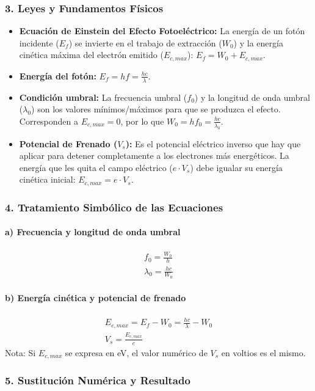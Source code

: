 \subsubsection*{3. Leyes y Fundamentos Físicos}
\begin{itemize}
    \item \textbf{Ecuación de Einstein del Efecto Fotoeléctrico:} La energía de un fotón incidente ($E_f$) se invierte en el trabajo de extracción ($W_0$) y la energía cinética máxima del electrón emitido ($E_{c,max}$): $E_f = W_0 + E_{c,max}$.
    \item \textbf{Energía del fotón:} $E_f = hf = \frac{hc}{\lambda}$.
    \item \textbf{Condición umbral:} La frecuencia umbral ($f_0$) y la longitud de onda umbral ($\lambda_0$) son los valores mínimos/máximos para que se produzca el efecto. Corresponden a $E_{c,max}=0$, por lo que $W_0 = hf_0 = \frac{hc}{\lambda_0}$.
    \item \textbf{Potencial de Frenado ($V_s$):} Es el potencial eléctrico inverso que hay que aplicar para detener completamente a los electrones más energéticos. La energía que les quita el campo eléctrico ($e \cdot V_s$) debe igualar su energía cinética inicial: $E_{c,max} = e \cdot V_s$.
\end{itemize}

\subsubsection*{4. Tratamiento Simbólico de las Ecuaciones}
\paragraph*{a) Frecuencia y longitud de onda umbral}
\begin{gather}
    f_0 = \frac{W_0}{h} \\
    \lambda_0 = \frac{hc}{W_0}
\end{gather}
\paragraph*{b) Energía cinética y potencial de frenado}
\begin{gather}
    E_{c,max} = E_f - W_0 = \frac{hc}{\lambda} - W_0 \\
    V_s = \frac{E_{c,max}}{e}
\end{gather}
Nota: Si $E_{c,max}$ se expresa en eV, el valor numérico de $V_s$ en voltios es el mismo.

\subsubsection*{5. Sustitución Numérica y Resultado}
